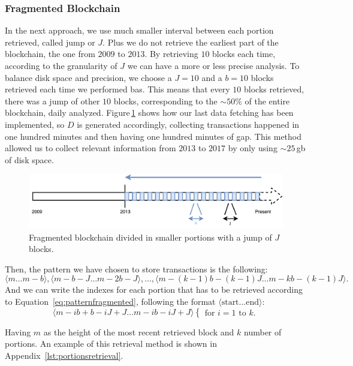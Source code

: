\documentclass[USenglish]{uit-thesis}
\begin{document}
\subsubsection{Fragmented Blockchain}
In the next approach, we use much smaller
interval between each portion
retrieved, called jump or $J$. Plus
we do not retrieve the earliest part of the
blockchain, the one from $2009$ to $2013$.
By retrieving $10$ blocks each time,
according to the granularity of $J$ we can
have a more or less precise analysis. To balance
disk space and precision, we choose a $J = 10$
and a $b = 10$ blocks retrieved each time
we performed \gls{bas}.
This means that every $10$ blocks retrieved, there was
a jump of other $10$ blocks, corresponding to the $\sim$$50\%$
of the entire blockchain, daily analyzed. Figure\,\ref{fig:portions_new}
shows how our last data fetching has been implemented,
so $D$ is generated accordingly, collecting transactions
happened in one hundred minutes and
then having one hundred minutes of gap.
This method allowed us to collect relevant
information from $2013$ to $2017$ by only
using $\sim$$25$\,\gls{gb} of disk space.
\begin{figure}[h]
	\centering
	\includegraphics[width=1\textwidth]{img/portions_new}
	\caption{Fragmented blockchain divided in smaller portions with
	a jump of $J$ blocks.}
	\label{fig:portions_new}
\end{figure}
Then, the pattern we have chosen to store
transactions is the following:
\[\langle m \dots m-b\rangle, \langle m-b-J \dots m-2b - J\rangle, \dots , \langle m-(k-1)b -(k-1)J \dots m - kb - (k-1)J\rangle.\]
And we can write the indexes for each portion that has to be retrieved
according to Equation~\ref{eq:patternfragmented},
following the format $\langle \text{start} \dots \text{end}\rangle$:
\begin{equation}
\label{eq:patternfragmented}
\langle m-ib+b-iJ+J\dots m-ib-iJ+J\rangle
\begin{cases}
\textrm{for } i = 1 \textrm{ to } k.
\end{cases}
\end{equation}

Having $m$ as the height of the most recent retrieved block and $k$ number
of portions. An example of this retrieval method is shown in
Appendix~\ref{lst:portionsretrieval}.
\end{document}
